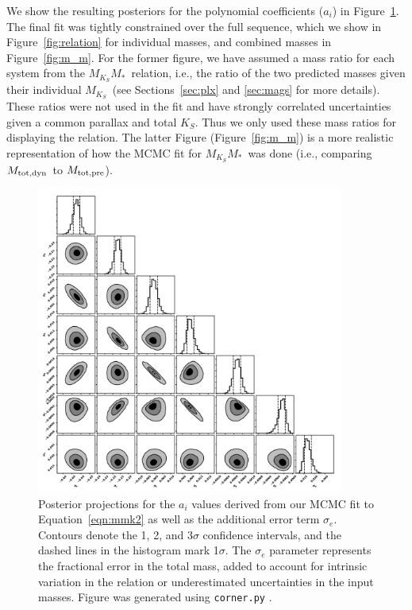 \documentclass[twocolumn]{aastex62}
\newcommand{\mks}{$M_{K_S}$}
\newcommand{\mmk}{$M_{K_S}$\textendash$M_*$}
\newcommand{\mpred}{$M_{\rm{tot,pre}}$}
\newcommand{\mdyn}{$M_{\rm{tot,dyn}}$}
\begin{document}
We show the resulting posteriors for the polynomial coefficients ($a_i$) in Figure~\ref{fig:fitpost}. The final fit was tightly constrained over the full sequence, which we show in Figure~\ref{fig:relation} for individual masses, and combined masses in Figure~\ref{fig:m_m}. For the former figure, we have assumed a mass ratio for each system from the \mmk\ relation, i.e., the ratio of the two predicted masses given their individual \mks\ (see Sections~\ref{sec:plx} and \ref{sec:mags} for more details). These ratios were not used in the fit and have strongly correlated uncertainties given a common parallax and total $K_S$. Thus we only used these mass ratios for displaying the relation. The latter Figure (Figure~\ref{fig:m_m}) is a more realistic representation of how the MCMC fit for \mmk\ was done (i.e., comparing \mdyn\ to \mpred).

\begin{figure}[p]
\begin{center}
\includegraphics[width=0.9\textwidth]{output_7_eMass.pdf}
\caption{Posterior projections for the $a_i$ values derived from our MCMC fit to Equation~\ref{eqn:mmk2} as well as the additional error term $\sigma_e$. Contours denote the 1, 2, and 3$\sigma$ confidence intervals, and the dashed lines in the histogram mark 1$\sigma$. The $\sigma_e$ parameter represents the fractional error in the total mass, added to account for intrinsic variation in the relation or underestimated uncertainties in the input masses. Figure was generated using {\tt corner.py} \citep{corner}.}
\label{fig:fitpost}
\end{center}
\end{figure}
\end{document}
